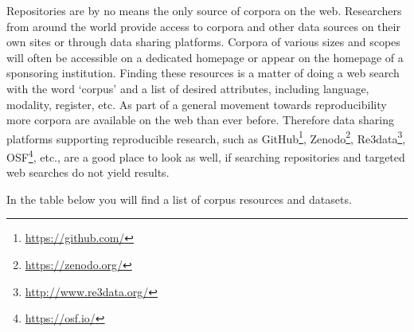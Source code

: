\documentclass[
]{article}
\DeclareRobustCommand{\href}[2]{#2\footnote{\url{#1}}}
\begin{document}
Repositories are by no means the only source of corpora on the web. Researchers from around the world provide access to corpora and other data sources on their own sites or through data sharing platforms. Corpora of various sizes and scopes will often be accessible on a dedicated homepage or appear on the homepage of a sponsoring institution. Finding these resources is a matter of doing a web search with the word `corpus' and a list of desired attributes, including language, modality, register, etc. As part of a general movement towards reproducibility more corpora are available on the web than ever before. Therefore data sharing platforms supporting reproducible research, such as \href{https://github.com/}{GitHub}, \href{https://zenodo.org/}{Zenodo}, \href{http://www.re3data.org/}{Re3data}, \href{https://osf.io/}{OSF}, etc., are a good place to look as well, if searching repositories and targeted web searches do not yield results.

In the table below you will find a list of corpus resources and datasets.
\end{document}
